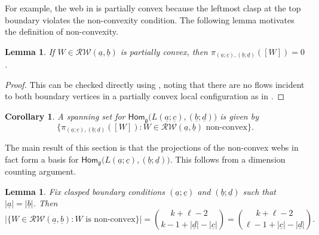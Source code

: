 \documentclass[11pt,a4paper,reqno]{amsart}
\newcommand{\g}{\mathfrak{g}}
\newcommand{\proj}{\pi_{(\underline a;\underline c),(\underline b;\underline d)}}
\renewcommand{\a}{\alpha}
\renewcommand{\b}{\mathfrak{b}}
\numberwithin{equation}{section}
\renewcommand{\hom}{\mathsf{Hom}}
\renewcommand{\a}{\underline a}
\renewcommand{\b}{\underline b}
\newcommand{\RW}{\mathcal{RW}}
\newtheorem{corollary}[thm]{Corollary}
\newtheorem{lemma}[thm]{Lemma}
\theoremstyle{definition}
\theoremstyle{remark}
\begin{document}
For example, the web in  is partially convex because the leftmost clasp at the top boundary violates the non-convexity condition.
The following lemma motivates the definition of non-convexity. 

\begin{lemma}\label{lem:non-convex}
    If $W\in \RW(\a,\b)$ is partially convex, then $\proj([W]) = 0$.
\end{lemma}

\begin{proof}
    This can be checked directly using , noting that there are no flows incident to both boundary vertices in a partially convex local configuration as in .
\end{proof}

\begin{corollary}\label{cor:spanning}
    A spanning set for $\hom_\g\big(L(\a;\underline c), (\b;\underline d)\big)$ is given by
    \[\{\proj([W]): W\in \RW(\a,\b) \text{ non-convex}\}.\]
\end{corollary}

The main result of this section is that the projections of the non-convex webs in fact form a basis for $\hom_\g\big(L(\a;\underline c), (\b;\underline d)\big)$. This follows from a dimension counting argument.

\begin{lemma}\label{lem:clasped_web_count}
    Fix clasped boundary conditions $(\a;\underline c)$ and $(\b;\underline d)$ such that $|\a| = |\b|$. Then
    \[|\{W\in \RW(\a,\b): W \text{ is non-convex}\}| = \binom{k+\ell-2}{k-1+|\underline d|-|\underline c|} = \binom{k+\ell-2}{\ell-1 +|\underline c|-|\underline d|}.\]
\end{lemma}
\end{document}
